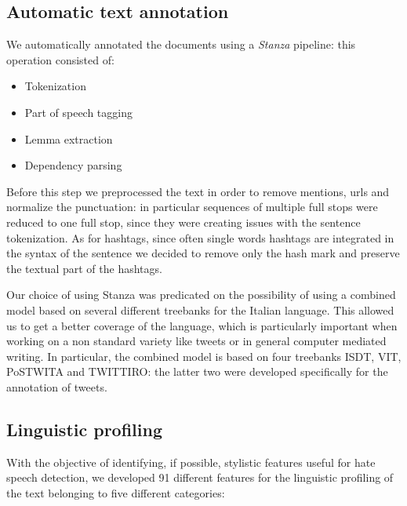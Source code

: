 \subsection{Automatic text annotation}
We automatically annotated the documents using a \emph{Stanza} \cite{stanza} pipeline: this operation consisted of:
\begin{itemize}
    \item Tokenization
    \item Part of speech tagging
    \item Lemma extraction
    \item Dependency parsing
\end{itemize}

Before this step we preprocessed the text in order to remove mentions, urls and normalize the punctuation: in particular sequences of multiple full stops were reduced to one full stop, since they were creating issues with the sentence tokenization.
As for hashtags, since often single words hashtags are integrated in the syntax of the sentence we decided to remove only the hash mark and preserve the textual part of the hashtags.

Our choice of using Stanza was predicated on the possibility of using a combined model based on several different treebanks for the Italian language.
This allowed us to get a better coverage of the language, which is particularly important when working on a non standard variety like tweets or in general computer mediated writing.
In particular, the combined model is based on four treebanks ISDT, VIT, PoSTWITA and TWITTIRO: the latter two were developed specifically for the annotation of tweets.

\subsection{Linguistic profiling}
With the objective of identifying, if possible, stylistic features useful for hate speech detection, we developed 91 different features for the linguistic profiling of the text belonging to five different categories:

